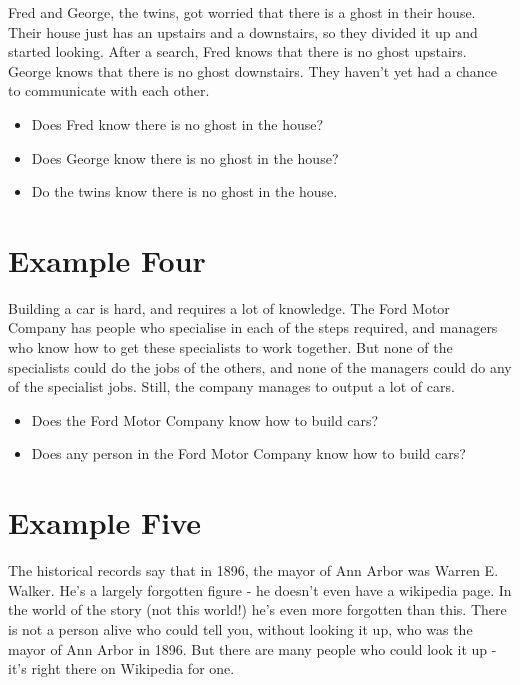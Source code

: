 \documentclass[
  11pt,
]{article}
\providecommand{\tightlist}{%
  \setlength{\itemsep}{0pt}\setlength{\parskip}{0pt}}
\begin{document}
Fred and George, the twins, got worried that there is a ghost in their
house. Their house just has an upstairs and a downstairs, so they
divided it up and started looking. After a search, Fred knows that there
is no ghost upstairs. George knows that there is no ghost downstairs.
They haven't yet had a chance to communicate with each other.

\begin{itemize}
\tightlist
\item
  Does Fred know there is no ghost in the house?
\item
  Does George know there is no ghost in the house?
\item
  Do the twins know there is no ghost in the house.
\end{itemize}

\newpage

\hypertarget{example-four}{%
\section{Example Four}\label{example-four}}

Building a car is hard, and requires a lot of knowledge. The Ford Motor
Company has people who specialise in each of the steps required, and
managers who know how to get these specialists to work together. But
none of the specialists could do the jobs of the others, and none of the
managers could do any of the specialist jobs. Still, the company manages
to output a lot of cars.

\begin{itemize}
\tightlist
\item
  Does the Ford Motor Company know how to build cars?
\item
  Does any person in the Ford Motor Company know how to build cars?
\end{itemize}

\hypertarget{example-five}{%
\section{Example Five}\label{example-five}}

The historical records say that in 1896, the mayor of Ann Arbor was
Warren E. Walker. He's a largely forgotten figure - he doesn't even have
a wikipedia page. In the world of the story (not this world!) he's even
more forgotten than this. There is not a person alive who could tell
you, without looking it up, who was the mayor of Ann Arbor in 1896. But
there are many people who could look it up - it's right there on
Wikipedia for one.
\end{document}
